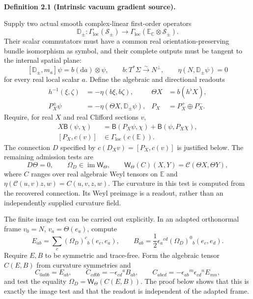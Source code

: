 \documentclass[
  english,
  11pt,
  reqno]{amsart}
\makeatletter
\newcommand{\pandocstatementheading}[1]{%
  \par\if@nobreak\else
    \addpenalty{\@beginparpenalty}%
    \addvspace{.5\baselineskip plus .2\baselineskip minus .2\baselineskip}%
  \fi
  {\normalfont\bfseries #1\par}%
  \nobreak\@afterindenttrue\@afterheading
}
\makeatother
\begin{document}
\pandocstatementheading{\leavevmode{}\label{def:online-intrinsic-vacuum-gradient}Definition 2.1 (Intrinsic vacuum gradient source).}

Supply two actual smooth complex-linear first-order operators%
 \[
\mathbb D_\pm:\Gamma_{\mathrm{loc}}(\mathscr S_\pm)
\longrightarrow
\Gamma_{\mathrm{loc}}(\mathbb E_{\mathbb C}\otimes\mathscr S_\pm).
\] Their scalar commutators must have a common real
orientation-preserving bundle isomorphism as symbol, and their complete
outputs must be tangent to the internal spatial plane:%
 \[
[\mathbb D_\pm,m_a]\psi=b(\mathrm da)\otimes\psi,
\qquad
b:T^*\Sigma\xrightarrow{\sim}N^\perp,
\qquad
\eta(N,\mathbb D_\pm\psi)=0
\] for every real local scalar \(a\). Define the algebraic and
directional readouts%
 \[
\begin{aligned}
h^{-1}(\xi,\zeta)&=-\eta(b\xi,b\zeta),&
\Theta X&=b(h^\flat X),\\
P_X^\pm\psi&=-\eta(\Theta X,\mathbb D_\pm\psi),&
P_X&=P_X^+\oplus P_X^-.
\end{aligned}
\] Require, for real \(X\) and real Clifford sections \(v\),%
 \[
\begin{aligned}
X\mathsf B(\psi,\chi)
&=\mathsf B(P_X\psi,\chi)+\mathsf B(\psi,P_X\chi),\\
[P_X,c(v)]&\in\Gamma_{\mathrm{loc}}(c(\mathbb E)).
\end{aligned}
\] The connection \(D\) specified by \(c(D_Xv)=[P_X,c(v)]\) is justified
below. The remaining admission tests are%
 \[
D\Theta=0,\qquad
\Omega_D\in\operatorname{im}\mathsf W_\Theta,
\qquad
\mathsf W_\Theta(C)(X,Y)=\mathcal C(\Theta X,\Theta Y),
\] where \(C\) ranges over real algebraic Weyl tensors on \(\mathbb E\)
and \(\eta(\mathcal C(u,v)z,w)=C(u,v,z,w)\). The curvature in this test
is computed from the recovered connection. Its Weyl preimage is a
readout, rather than an independently supplied curvature field.

The finite image test can be carried out explicitly. In an adapted
orthonormal frame \(v_0=N\), \(v_a=\Theta(e_a)\), compute%
 \[
E_{ab}=\sum_c(\Omega_D)^c{}_b(e_c,e_a),
\qquad
B_{ab}=\frac12\epsilon_a{}^{cd}(\Omega_D)^0{}_b(e_c,e_d).
\] Require \(E,B\) to be symmetric and trace-free. Form the algebraic
tensor \(C(E,B)\) from curvature symmetries and%
 \[
C_{0a0b}=E_{ab},\qquad
C_{cd0b}=-\epsilon_{cd}{}^a B_{ab},\qquad
C_{abcd}=-\epsilon_{ab}{}^m\epsilon_{cd}{}^n E_{mn},
\] and test the equality \(\Omega_D=\mathsf W_\Theta(C(E,B))\). The
proof below shows that this is exactly the image test and that the
readout is independent of the adapted frame.
\end{document}
